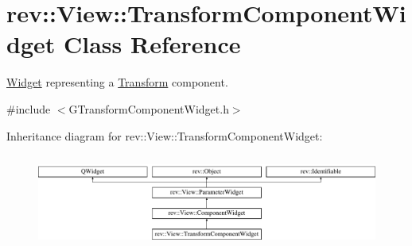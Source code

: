 \hypertarget{classrev_1_1_view_1_1_transform_component_widget}{}\section{rev\+::View\+::Transform\+Component\+Widget Class Reference}
\label{classrev_1_1_view_1_1_transform_component_widget}


\mbox{\hyperlink{class_widget}{Widget}} representing a \mbox{\hyperlink{classrev_1_1_transform}{Transform}} component.  




{\ttfamily \#include $<$G\+Transform\+Component\+Widget.\+h$>$}

Inheritance diagram for rev\+::View\+::Transform\+Component\+Widget\+:\begin{figure}[H]
\begin{center}
\leavevmode
\includegraphics[height=3.150492cm]{classrev_1_1_view_1_1_transform_component_widget}
\end{center}
\end{figure}

